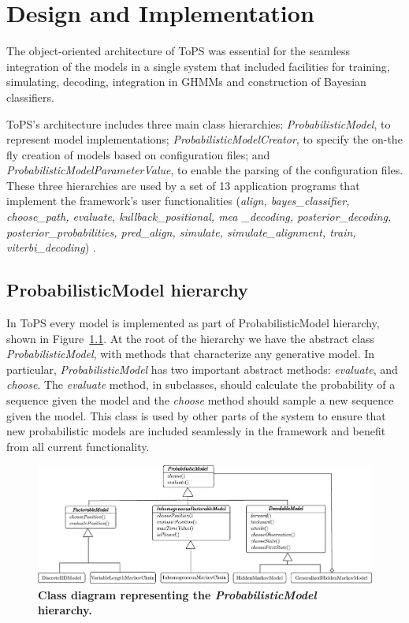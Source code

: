\chapter{Design and Implementation}

The object-oriented architecture of ToPS was essential for the seamless integration of the models in a single system that included facilities for training, simulating, decoding, integration in GHMMs and construction of Bayesian classifiers.

ToPS's architecture includes  three main class hierarchies:
\textit{ProbabilisticModel}, to represent model implementations; \textit{Probabili\-stic\-ModelCreator}, to specify the on-the fly creation of models based on configuration files;  and \textit{ProbabilisticModelParameterValue}, to enable the parsing of the configuration files. These three hierarchies are used by a set of 13 application programs that implement the framework's user functionalities (\textit{align, bayes\_classifier, choose\_path, evaluate, kullback\_positional, mea \_decoding, posterior\_decoding, posterior\_probabilities, pred\_align, simulate, simulate\_alignment, train, viterbi\_decoding}) .


\section{ProbabilisticModel  hierarchy}

In ToPS every model is implemented as part of ProbabilisticModel hierarchy, shown in Figure~\ref{fig:models}.  At the root of the hierarchy  we have the  abstract class {\it ProbabilisticModel}, with methods that characterize any generative model. In particular, {\it ProbabilisticModel} has two important abstract methods: {\it evaluate}, and {\it choose}. The {\it evaluate} method, in subclasses,  should calculate the probability of a sequence given the model and the {\it choose} method should sample a new sequence given the model. This class is used by other parts of the system to ensure that new probabilistic models are included seamlessly in the framework and benefit from all current functionality.


\begin{figure}[htpb]
  \centering
  \includegraphics[width=\textwidth]{diagrama_classe}
  \caption{ {\bf Class diagram representing the \textit{ProbabilisticModel} hierarchy.} }
  \label{fig:models}
\end{figure}


